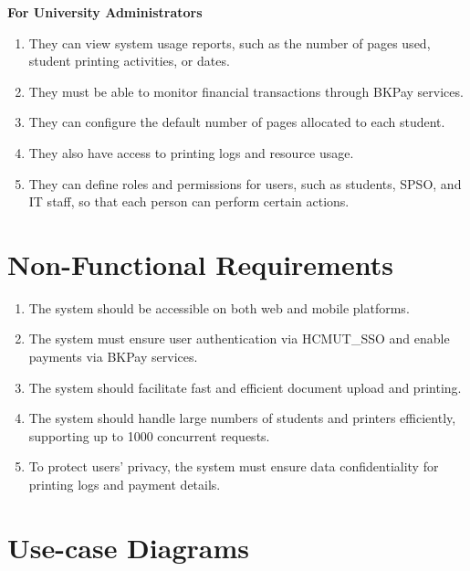 \newpage
\textbf{For University Administrators}
\begin{enumerate}
    \item They can view system usage reports, such as the number of pages used, student printing activities, or dates.
    \item They must be able to monitor financial transactions through BKPay services.
    \item They can configure the default number of pages allocated to each student.
    \item They also have access to printing logs and resource usage.
    \item They can define roles and permissions for users, such as students, SPSO, and IT staff, so that each person can perform certain actions.
\end{enumerate}

\section{Non-Functional Requirements}
\begin{enumerate}
    \item The system should be accessible on both web and mobile platforms.
    \item The system must ensure user authentication via HCMUT\_SSO and enable payments via BKPay services.
    \item The system should facilitate fast and efficient document upload and printing.
    \item The system should handle large numbers of students and printers efficiently, supporting up to 1000 concurrent requests.
    \item To protect users' privacy, the system must ensure data confidentiality for printing logs and payment details.
\end{enumerate}

\section{Use-case Diagrams}
